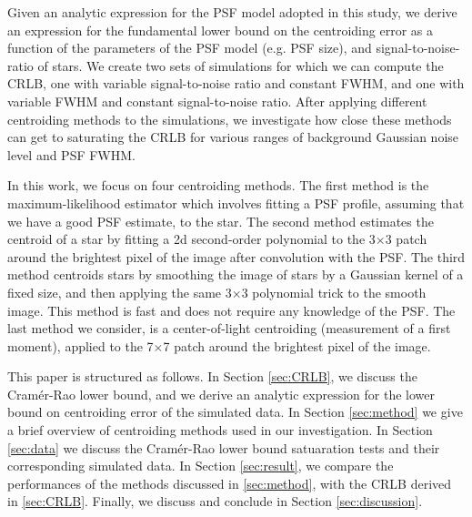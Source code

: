 \documentclass[12pt, preprint]{aastex}
\begin{document}

Given an analytic expression for the PSF model adopted in this study,
we derive an expression for the fundamental lower bound on the centroiding error as
a function of the parameters of the PSF model (e.g. PSF size),
and signal-to-noise-ratio of stars. We create two sets of simulations for which we can 
compute the CRLB, one with variable signal-to-noise ratio and constant FWHM, and one 
with variable FWHM and constant signal-to-noise ratio. After applying
different centroiding methods to the simulations, we investigate how close 
these methods can get to saturating the CRLB for various ranges of background 
Gaussian noise level and PSF FWHM.

In this work, we focus on four centroiding methods. The first method is the maximum-likelihood 
estimator which involves fitting a PSF profile, assuming that we have a good PSF estimate, to the star. 
The second method estimates the centroid of a star by fitting a 2d second-order polynomial to 
the 3$\times$3 patch around the brightest pixel of the image after convolution with the PSF. 
The third method centroids stars by
 smoothing the image of stars by a Gaussian kernel of a fixed size,
 and then applying the same 3$\times$3 polynomial trick to the smooth
 image. This method is fast and does not require any knowledge of the 
PSF. The last method we consider, is a center-of-light centroiding 
(measurement of a first moment), applied to the 7$\times$7 patch around the brightest pixel of the image.

This paper is structured as follows. In Section \ref{sec:CRLB},
we discuss the Cram\'{e}r-Rao lower bound, and we derive
an analytic expression for the lower bound on centroiding error
of the simulated data. 
In Section \ref{sec:method} we give a brief overview of 
centroiding methods used in our investigation.
In Section \ref{sec:data} we discuss the Cram\'{e}r-Rao lower bound satuaration
tests and their corresponding simulated data.
In Section \ref{sec:result}, we compare the performances of the methods
discussed in \ref{sec:method}, with the CRLB derived in \ref{sec:CRLB}. Finally,
 we discuss and conclude in Section \ref{sec:discussion}.               
\end{document}
